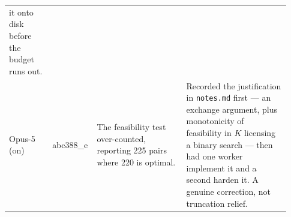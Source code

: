 \documentclass{article}
\begin{document}
\begin{table}[p]
\begin{tabular}{@{}p{0.155\linewidth}p{0.101\linewidth}p{0.310\linewidth}p{0.364\linewidth}@{}}
it onto disk before the budget runs out. \\
\addlinespace
Opus-5 \newline (on) & abc388\_e & The feasibility test over-counted, reporting 225 pairs where 220
is optimal. & Recorded the justification in \texttt{notes.md} first --- an exchange argument,
plus monotonicity of feasibility in $K$ licensing a binary search --- then had one worker implement
it and a second harden it. A genuine correction, not truncation relief. \\
\bottomrule
\end{tabular}
\end{table}








\end{document}

